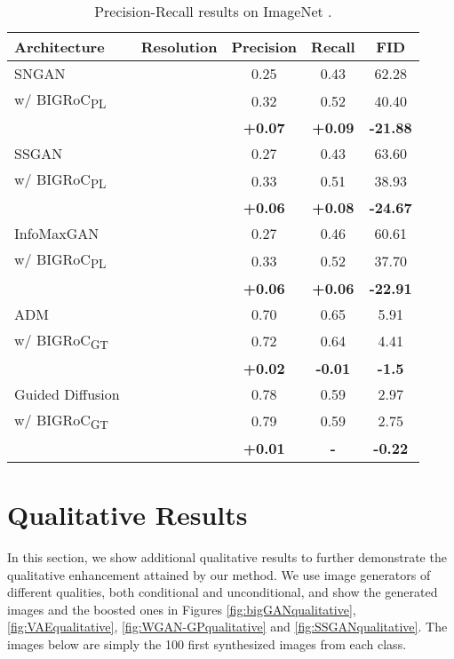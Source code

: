 \documentclass[10pt]{article} \usepackage[accepted]{tmlr}
\begin{document}
\begin{table}[ht]
\caption{\label{tab:precision_recall}Precision-Recall results on ImageNet .}
\centering
\begin{tabular}{lc|cc|c}
\toprule
Architecture & Resolution & Precision  & Recall  & FID \\
\midrule
\rowcolor{LightGray}SNGAN~\citep{miyato2018spectral} &  & 0.25 & 0.43 & 62.28 \\ 
w/ BIGRoC\textsubscript{PL} && 0.32 & 0.52 & 40.40 \\ 
 & & \color{mygreen}\textbf{+0.07} & \color{mygreen}\textbf{+0.09} & \color{mygreen}\textbf{-21.88} \\
\hline
\rowcolor{LightGray}SSGAN~\citep{chen2019selfsupervised} &  & 0.27 & 0.43 & 63.60 \\ 
w/ BIGRoC\textsubscript{PL} && 0.33 & 0.51 & 38.93\\
 & & \color{mygreen}\textbf{+0.06} & \color{mygreen}\textbf{+0.08} & \color{mygreen}\textbf{-24.67} \\
\hline
\rowcolor{LightGray}InfoMaxGAN~\citep{Lee_2021_WACV} &  & 0.27 & 0.46 & 60.61 \\ 
w/ BIGRoC\textsubscript{PL} && 0.33 & 0.52 & 37.70 \\
 & & \color{mygreen}\textbf{+0.06} & \color{mygreen}\textbf{+0.06} & \color{mygreen}\textbf{-22.91} \\
\hline
\rowcolor{LightGray}ADM~\citep{dhariwal2021diffusion} &  & 0.70 & 0.65 & 5.91 \\ 
w/ BIGRoC\textsubscript{GT} && 0.72 & 0.64 & 4.41 \\
 & & \color{mygreen}\textbf{+0.02} & \color{red}\textbf{-0.01} & \color{mygreen}\textbf{-1.5} \\
\hline
\rowcolor{LightGray}Guided Diffusion~\citep{dhariwal2021diffusion} &  & 0.78 & 0.59 & 2.97\\
w/ BIGRoC\textsubscript{GT} && 0.79 & 0.59 & 2.75 \\
 & & \color{mygreen}\textbf{+0.01} & \textbf{-} & \color{mygreen}\textbf{-0.22} \\
\bottomrule
\end{tabular}
\end{table}


\section{Qualitative Results}
\label{sec:qualitative_res}
In this section, we show additional qualitative results to further demonstrate the qualitative enhancement attained by our method.
We use image generators of different qualities, both conditional and unconditional, and show the generated images and the boosted ones in Figures \ref{fig:bigGANqualitative}, \ref{fig:VAEqualitative}, \ref{fig:WGAN-GPqualitative} and \ref{fig:SSGANqualitative}.
The images below are simply the 100 first synthesized images from each class.
\end{document}
